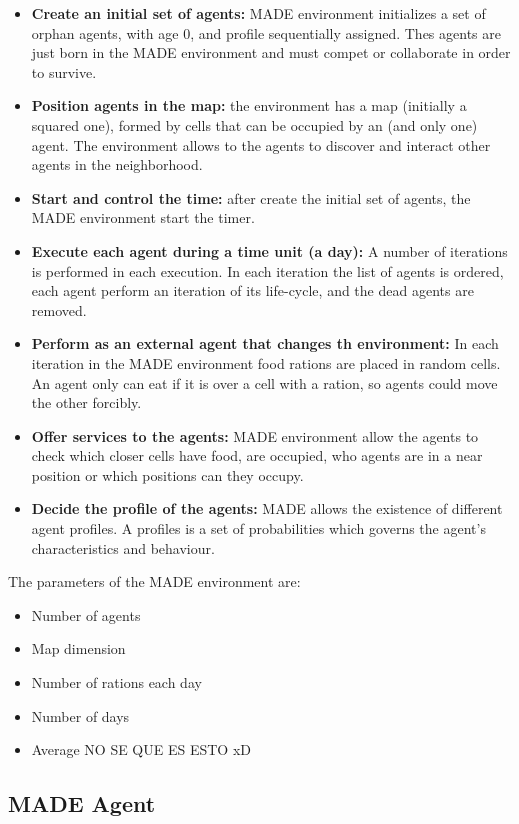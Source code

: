 \documentclass[final,1p,times]{elsarticle}
\begin{document}
\begin{itemize}
\item \textbf{Create an initial set of agents:} MADE environment initializes a set of orphan agents, with age 0, and profile sequentially assigned. Thes agents are just born in the MADE environment and must compet or collaborate in order to survive.
\item \textbf{Position agents in the map:} the environment has a map (initially a squared one), formed by cells that can be occupied by an (and only one) agent. The environment allows to the agents to discover and interact other agents in the neighborhood.
\item \textbf{Start and control the time:} after create the initial set of agents, the MADE environment start the timer.
\item \textbf{Execute each agent during a time unit (a day):} A number of iterations is performed in each execution. In each iteration the list of agents is ordered, each agent perform an iteration of its life-cycle, and the dead agents are removed.
\item \textbf{Perform as an external agent that changes th environment:} In each iteration in the MADE environment food rations are placed in random cells. An agent only can eat if it is over a cell with a ration, so agents could move the other forcibly.
\item \textbf{Offer services to the agents:} MADE environment allow the agents to check which closer cells have food, are occupied, who agents are in a near position or which positions can they occupy.
\item \textbf{Decide the profile of the agents:} MADE allows the existence of different agent profiles. A profiles is a set of probabilities which governs the agent's characteristics and behaviour.
\end{itemize}

The parameters of the MADE environment are:
\begin{itemize}
\item Number of agents
\item Map dimension
\item Number of rations each day
\item Number of days
\item Average NO SE QUE ES ESTO xD
\end{itemize}
\subsection{MADE Agent}
\end{document}
